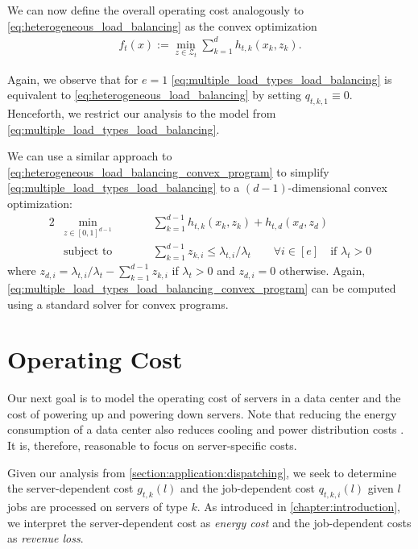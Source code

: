 We can now define the overall operating cost analogously to \autoref{eq:heterogeneous_load_balancing} as the convex optimization \begin{align}\label{eq:multiple_load_types_load_balancing}
    f_t(x) := \min_{z \in \mathcal{Z}_t} \sum_{k=1}^d h_{t,k}(x_k,z_k).
\end{align}

Again, we observe that for $e = 1$ \autoref{eq:multiple_load_types_load_balancing} is equivalent to \autoref{eq:heterogeneous_load_balancing} by setting $q_{t,k,1} \equiv 0$. Henceforth, we restrict our analysis to the model from \autoref{eq:multiple_load_types_load_balancing}.

We can use a similar approach to \autoref{eq:heterogeneous_load_balancing_convex_program} to simplify \autoref{eq:multiple_load_types_load_balancing} to a $(d-1)$-dimensional convex optimization: \begin{alignat}{2}\label{eq:multiple_load_types_load_balancing_convex_program}
    &\min_{z \in [0,1]^{d-1}} &\qquad&\sum_{k=1}^{d-1} h_{t,k}(x_k,z_k) + h_{t,d}(x_d,z_d) \\
    &\textrm{subject to}  &      &\sum_{k=1}^{d-1} z_{k,i} \leq \lambda_{t,i} / \lambda_t \qquad\forall i \in [e]\quad\text{if }\lambda_t > 0 \nonumber
\end{alignat} where $z_{d,i} = \lambda_{t,i} / \lambda_t - \sum_{k=1}^{d-1} z_{k,i}$ if $\lambda_t > 0$ and $z_{d,i} = 0$ otherwise. Again, \autoref{eq:multiple_load_types_load_balancing_convex_program} can be computed using a standard solver for convex programs.

\section{Operating Cost}\label{section:application:operating_cost}

Our next goal is to model the operating cost of servers in a data center and the cost of powering up and powering down servers. Note that reducing the energy consumption of a data center also reduces cooling and power distribution costs \cite{Lin2011, Clark2005}. It is, therefore, reasonable to focus on server-specific costs.

Given our analysis from \autoref{section:application:dispatching}, we seek to determine the server-dependent cost $g_{t,k}(l)$ and the job-dependent cost $q_{t,k,i}(l)$ given $l$ jobs are processed on servers of type $k$. As introduced in \autoref{chapter:introduction}, we interpret the server-dependent cost as \emph{energy cost} and the job-dependent costs as \emph{revenue loss}.

